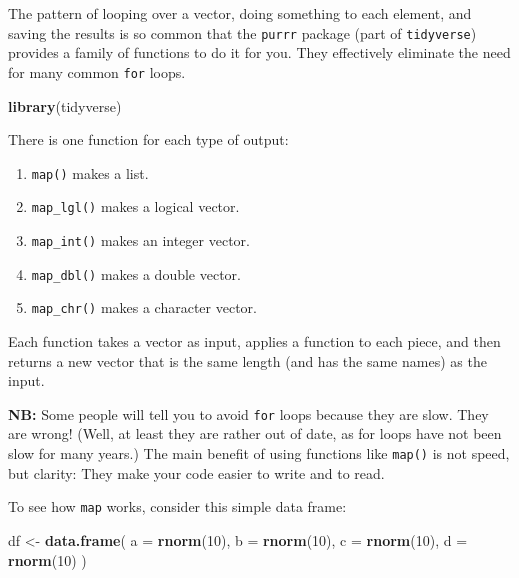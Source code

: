 \documentclass[]{book}
\newenvironment{Shaded}{\begin{snugshade}}{\end{snugshade}}
\newcommand{\KeywordTok}[1]{\textcolor[rgb]{0.13,0.29,0.53}{\textbf{#1}}}
\newcommand{\DataTypeTok}[1]{\textcolor[rgb]{0.13,0.29,0.53}{#1}}
\newcommand{\DecValTok}[1]{\textcolor[rgb]{0.00,0.00,0.81}{#1}}
\newcommand{\StringTok}[1]{\textcolor[rgb]{0.31,0.60,0.02}{#1}}
\newcommand{\NormalTok}[1]{#1}
\providecommand{\tightlist}{%
  \setlength{\itemsep}{0pt}\setlength{\parskip}{0pt}}
\begin{document}
The pattern of looping over a vector, doing something to each element,
and saving the results is so common that the \texttt{purrr} package
(part of \texttt{tidyverse}) provides a family of functions to do it for
you. They effectively eliminate the need for many common \texttt{for}
loops.

\begin{Shaded}
\begin{Highlighting}[]
\KeywordTok{library}\NormalTok{(tidyverse)}
\end{Highlighting}
\end{Shaded}

There is one function for each type of output:

\begin{enumerate}
\def\labelenumi{\arabic{enumi}.}
\tightlist
\item
  \texttt{map()} makes a list.
\item
  \texttt{map\_lgl()} makes a logical vector.
\item
  \texttt{map\_int()} makes an integer vector.
\item
  \texttt{map\_dbl()} makes a double vector.
\item
  \texttt{map\_chr()} makes a character vector.
\end{enumerate}

Each function takes a vector as input, applies a function to each piece,
and then returns a new vector that is the same length (and has the same
names) as the input.

\textbf{NB:} Some people will tell you to avoid \texttt{for} loops
because they are slow. They are wrong! (Well, at least they are rather
out of date, as for loops have not been slow for many years.) The main
benefit of using functions like \texttt{map()} is not speed, but
clarity: They make your code easier to write and to read.

To see how \texttt{map} works, consider this simple data frame:

\begin{Shaded}
\begin{Highlighting}[]
\NormalTok{df <-}\StringTok{ }\KeywordTok{data.frame}\NormalTok{(}
  \DataTypeTok{a =} \KeywordTok{rnorm}\NormalTok{(}\DecValTok{10}\NormalTok{),}
  \DataTypeTok{b =} \KeywordTok{rnorm}\NormalTok{(}\DecValTok{10}\NormalTok{),}
  \DataTypeTok{c =} \KeywordTok{rnorm}\NormalTok{(}\DecValTok{10}\NormalTok{),}
  \DataTypeTok{d =} \KeywordTok{rnorm}\NormalTok{(}\DecValTok{10}\NormalTok{)}
\NormalTok{)}
\end{Highlighting}
\end{Shaded}
\end{document}
